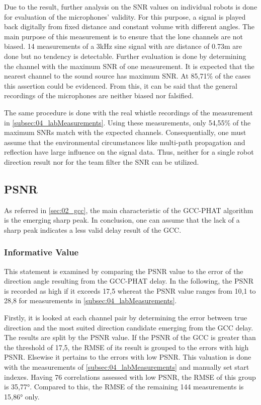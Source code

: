 Due to the result, further analysis on the \ac{SNR} values
on individual robots is done for evaluation of the microphones' validity.
For this purpose, a signal is played back digitally from fixed distance
and constant volume with different angles.
The main purpose of this measurement is to ensure that the lone channels
are not biased.
14 measurements of a 3\si{\kilo\hertz} sine signal
with are distance of 0.73\si{m} are done but no tendency is detectable.
Further evaluation is done by determining the channel with the maximum
\ac{SNR} of one measurement.
It is expected that the nearest channel to the sound source has maximum \ac{SNR}.
At 85,71\si{\percent} of the cases this assertion could be evidenced.
From this, it can be said that the general recordings of the microphones
are neither biased nor falsified.

The same procedure is done with the real whistle recordings of the
measurement in \cref{subsec:04_labMeasurements}.
Using these measurements, only 54,55\si{\percent} of the maximum \acp{SNR}
match with the expected channels.
Consequentially, one must assume that the environmental circumstances
like multi-path propagation and reflection have large influence
on the signal data.
Thus, neither for a single robot direction result nor for the team filter
the \ac{SNR} can be utilized.

\subsection{PSNR}
\label{subsec:04_psnr}

As referred in \cref{sec:02_gcc}, the main characteristic of the \ac{GCC-PHAT}
algorithm is the emerging sharp peak.
In conclusion, one can assume that the lack of a sharp peak indicates
a less valid delay result of the \ac{GCC}.

\subsubsection*{Informative Value}

This statement is examined by comparing the \ac{PSNR} value
to the error of the direction angle resulting from the \ac{GCC-PHAT} delay.
In the following, the \ac{PSNR} is recorded as high if it exceeds 17,5 whereat the
\ac{PSNR} value ranges from 10,1 to 28,8 for measurements in
\cref{subsec:04_labMeasurements}.

Firstly, it is looked at each channel pair by determining the
error between true direction and the most suited direction candidate emerging
from the \ac{GCC} delay.
The results are split by the \ac{PSNR} value.
If the \ac{PSNR} of the \ac{GCC} is greater than the threshold of 17,5,
the \ac{RMSE} of its result is grouped to the errors with high \ac{PSNR}.
Elsewise it pertains to the errors with low \ac{PSNR}.
This valuation is done with the measurements of \cref{subsec:04_labMeasurements}
and manually set start indexes.
Having 76 correlations assessed with low \ac{PSNR}, the \ac{RMSE} of this group
is 35,77\si{\degree}.
Compared to this, the \ac{RMSE} of the remaining 144 measurements
is 15,86\si{\degree} only.

